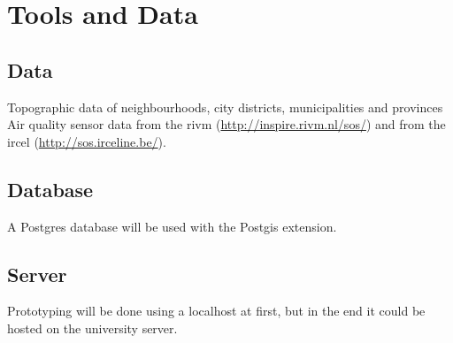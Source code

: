 


\section{Tools and Data}
\label{chap:TD}

\subsection{Data}
Topographic data of neighbourhoods, city districts, municipalities and provinces\\

Air quality sensor data from the \ac{rivm} (\url{http://inspire.rivm.nl/sos/}) and from the \ac{ircel} (\url{http://sos.irceline.be/}). \\

\iffalse
The \ac{lustre} aims to "help users to easier and better express and use thesauri and controlled vocabularies for metadata work within Spatial Data Infrastructures" \cite[p. 137]{LD:LusTRE}. This ontology does not focus on sensor data, but does describe many environmental phenomenon that are being observed. This fits with the idea of \cite{SSW:Cox4} to use ontologies that are already available online for defining metadata elements of sensor data. Since the \ac{sos} from the \ac{RIVM} and the \ac{sos} from \ac{irceline} provides information on   
\fi

\subsection{Database}
A Postgres database will be used with the Postgis extension.

\subsection{Server}
Prototyping will be done using a localhost at first, but in the end it could be hosted on the university server.


